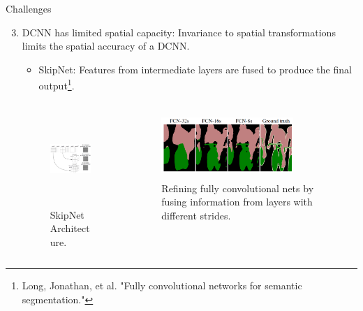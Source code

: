 \documentclass{beamer}
\begin{document}
\begin{frame}{Challenges}
\begin{enumerate}
	\setcounter{enumi}{2}
	\item {\color{blue}DCNN has limited {\color{blue}spatial capacity}}:  Invariance to spatial transformations limits the spatial accuracy of a DCNN.

	\begin{itemize}
		\item SkipNet: Features from intermediate layers are fused to produce the final output\footnote{Long, Jonathan, et al. "Fully convolutional networks for semantic segmentation."\label{note1}}.
	\end{itemize}	
	\begin{columns}
		\begin{column}{0.5\textwidth}
			\begin{figure}
				\centering
				\includegraphics[width=5cm,height=3.5cm]{figure/ss10.png}
				\captionsetup{justification=centering}
				\caption{SkipNet Architecture.}	
			\end{figure}
		\end{column}
		\begin{column}{0.5\textwidth}  
			\begin{center}
			\begin{figure}
				\centering
				\includegraphics[width=5cm,height=2.5cm]{figure/ss27.png}
				\captionsetup{justification=centering}
				\caption{Refining fully convolutional nets by fusing information from layers with different strides.}
			\end{figure}
			\end{center}
		\end{column}
	\end{columns}
\end{enumerate}
\end{frame}
\end{document}
